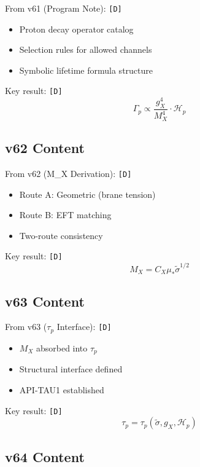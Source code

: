 \documentclass[11pt,a4paper]{article}
\newcommand{\tagD}{\textcolor{green!50!black}{\texttt{[D]}}}
\theoremstyle{definition}
\begin{document}
From v61 (Program Note): \tagD{}
\begin{itemize}
\item Proton decay operator catalog
\item Selection rules for allowed channels
\item Symbolic lifetime formula structure
\end{itemize}

Key result: \tagD{}
\begin{equation}
\label{eq:v61-key}
\Gamma_p \propto \frac{g_X^4}{M_X^4} \cdot \mathcal{H}_p
\end{equation}

\subsection{v62 Content}
\label{app:v62-content}

From v62 (M\_X Derivation): \tagD{}
\begin{itemize}
\item Route A: Geometric (brane tension)
\item Route B: EFT matching
\item Two-route consistency
\end{itemize}

Key result: \tagD{}
\begin{equation}
\label{eq:v62-key}
M_X = C_X \mu_* \tilde{\sigma}^{1/2}
\end{equation}

\subsection{v63 Content}
\label{app:v63-content}

From v63 ($\tau_p$ Interface): \tagD{}
\begin{itemize}
\item $M_X$ absorbed into $\tau_p$
\item Structural interface defined
\item API-TAU1 established
\end{itemize}

Key result: \tagD{}
\begin{equation}
\label{eq:v63-key}
\tau_p = \tau_p(\tilde{\sigma}, g_X, \mathcal{H}_p)
\end{equation}

\subsection{v64 Content}
\label{app:v64-content}
\end{document}
